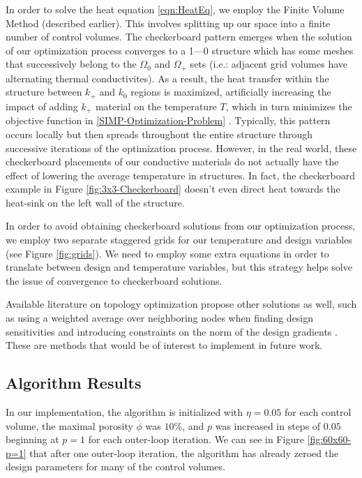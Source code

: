 In order to solve the heat equation \eqref{eqn:HeatEq}, we employ the Finite Volume Method (described earlier). This involves splitting up our space into a finite number of control volumes. The checkerboard pattern emerges when the solution of our optimization process converges to a 1---0 structure which has some meshes that successively belong to the $\Omega_0$ and $\Omega_+$ sets (i.e.: adjacent grid volumes have alternating thermal conductivites). As a result, the heat transfer within the structure between $k_+$ and $k_0$ regions is maximized, artificially increasing the impact of adding $k_+$ material on the temperature $T$, which in turn minimizes the objective function in \eqref{SIMP-Optimization-Problem} \cite{Versteeg2007}. Typically, this pattern occurs locally but then spreads throughout the entire structure through successive iterations of the optimization process. However, in the real world, these checkerboard placements of our conductive materials do not actually have the effect of lowering the average temperature in structures. In fact, the checkerboard example in Figure \ref{fig:3x3-Checkerboard} doesn't even direct heat towards the heat-sink on the left wall of the structure.

In order to avoid obtaining checkerboard solutions from our optimization process, we employ two separate staggered grids for our temperature and design variables (see Figure \ref{fig:grids}). We need to employ some extra equations in order to translate between design and temperature variables, but this strategy helps solve the issue of convergence to checkerboard solutions.

Available literature on topology optimization propose other solutions as well, such as using a weighted average over neighboring nodes when finding design sensitivities and introducing constraints on the norm of the design gradients \cite{Sigmund1998}. These are methods that would be of interest to implement in future work.

\subsection{Algorithm Results}

In our implementation, the algorithm is initialized with $\eta=0.05$ for each control volume, the maximal porosity $\overline{\phi}$ was $10\%$, and $p$ was increased in steps of $0.05$ beginning at $p=1$ for each outer-loop iteration. We can see in Figure \ref{fig:60x60-p=1} that after one outer-loop iteration, the algorithm has already zeroed the design parameters for many of the control volumes.

